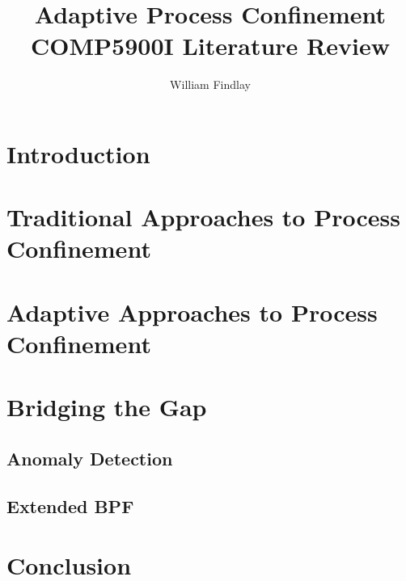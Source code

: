 \documentclass[dvipsnames]{article}
\title{\huge Adaptive Process Confinement\\ {\large COMP5900I Literature Review}}
\author{William Findlay}
\begin{document}
\maketitle
\thispagestyle{plain}


\setcounter{page}{1}



\section{Introduction}

\section{Traditional Approaches to Process Confinement}

\section{Adaptive Approaches to Process Confinement}

\section{Bridging the Gap }

\subsection{Anomaly Detection}

\subsection{Extended BPF}

\section{Conclusion}


\nocite{*}
\clearpage
\printbibliography
\end{document}
